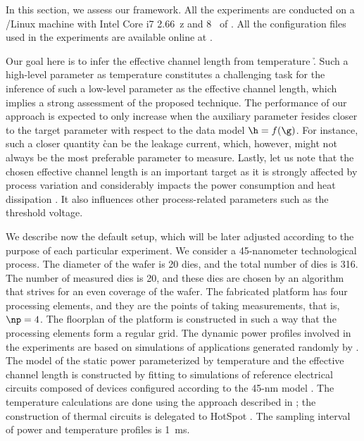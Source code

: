 In this section, we assess our framework. All the experiments are conducted on a
/Linux machine with Intel Core i7 2.66~z and 8~ of
. All the configuration files used in the experiments are available
online at \cite{eslab2013}.

Our goal here is to infer the effective channel length \g from temperature \h.
Such a high-level parameter as temperature constitutes a challenging task for
the inference of such a low-level parameter as the effective channel length,
which implies a strong assessment of the proposed technique. The performance of
our approach is expected to only increase when the auxiliary parameter \h
resides closer to the target parameter \g with respect to the data model $\h =
f(\g)$. For instance, such a closer quantity \h can be the leakage current,
which, however, might not always be the most preferable parameter to measure.
Lastly, let us note that the chosen effective channel length is an important
target as it is strongly affected by process variation and considerably impacts
the power consumption and heat dissipation \cite{chandrakasan2000,
srivastava2010, juan2012}. It also influences other process-related parameters
such as the threshold voltage.

We describe now the default setup, which will be later adjusted according to the
purpose of each particular experiment. We consider a 45-nanometer technological
process. The diameter of the wafer is 20 dies, and the total number of dies \nd
is 316. The number of measured dies \hnd is 20, and these dies are chosen by an
algorithm that strives for an even coverage of the wafer. The fabricated
platform has four processing elements, and they are the points of taking
measurements, that is, $\np = 4$. The floorplan of the platform is constructed
in such a way that the processing elements form a regular grid. The dynamic
power profiles involved in the experiments are based on simulations of
applications generated randomly by  \cite{dick1998}. The model of the
static power parameterized by temperature and the effective channel length is
constructed by fitting to  simulations of reference electrical
circuits composed of  devices \cite{bsim} configured according to the
45-nm   model \cite{ptm}. The temperature calculations are done
using the approach described in ; the
construction of thermal  circuits is delegated to HotSpot
\cite{skadron2003}. The sampling interval of power and temperature profiles is
1~ms.

